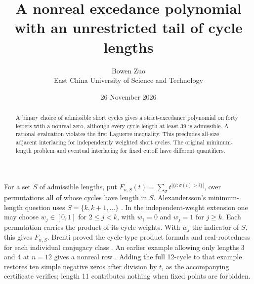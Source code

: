 \documentclass[11pt]{article}
\title{A nonreal excedance polynomial with an unrestricted tail of cycle lengths}
\author{Bowen Zuo\\{\small East China University of Science and Technology}}
\date{26 November 2026}
\begin{document}
\maketitle
\begin{abstract}
A binary choice of admissible short cycles gives a strict-excedance polynomial on forty letters with a nonreal zero, although every cycle length at least 39 is admissible. A rational evaluation violates the first Laguerre inequality. This precludes all-size adjacent interlacing for independently weighted short cycles. The original minimum-length problem and eventual interlacing for fixed cutoff have different quantifiers.
\end{abstract}

For a set \(S\) of admissible lengths, put
\(F_{n,S}(t)=\sum_\sigma t^{|\{i:\sigma(i)>i\}|}\), over permutations all of whose cycles have length in \(S\). Alexandersson's minimum-length question uses \(S=\{k,k+1,\ldots\}\) \cite{alex}. In the independent-weight extension one may choose \(w_j\in[0,1]\) for \(2\le j<k\), with \(w_1=0\) and \(w_j=1\) for \(j\ge k\). Each permutation carries the product of its cycle weights. With \(w_j\) the indicator of \(S\), this gives \(F_{n,S}\). Brenti proved the cycle-type product formula and real-rootedness for each individual conjugacy class \cite[Theorems 3.1--3.2]{brenti}. An earlier example allowing only lengths 3 and 4 at \(n=12\) gives a nonreal row \cite{older}. Adding the full 12-cycle to that example restores ten simple negative zeros after division by \(t\), as the accompanying certificate verifies; length 11 contributes nothing when fixed points are forbidden.
\end{document}
